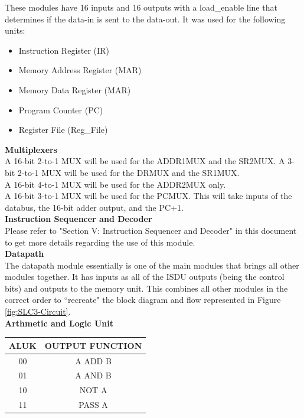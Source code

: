 \documentclass[journal, twocolumn, final,11pt,letterpaper]{IEEEtran}
\begin{document}
These modules have 16 inputs and 16 outputs with a load\_enable line that determines if the data-in is sent to the data-out. It was used for the following units: 
\begin{itemize}
	\item Instruction Register (IR)
	\item Memory Address Register (MAR)
	\item Memory Data Register (MAR)
	\item Program Counter (PC)
	\item Register File (Reg\_File)
\end{itemize} 

\normalsize\textbf{Multiplexers} \\

A 16-bit 2-to-1 MUX will be used for the ADDR1MUX and the SR2MUX. A 3-bit 2-to-1 MUX will be used for the DRMUX and the SR1MUX. \\

A 16-bit 4-to-1 MUX will be used for the ADDR2MUX only. \\

A 16-bit 3-to-1 MUX will be used for the PCMUX. This will take inputs of the databus, the 16-bit adder output, and the PC+1. \\

\normalsize\textbf{Instruction Sequencer and Decoder } \\

Please refer to "Section V: Instruction Sequencer and Decoder" in this document to get more details regarding the use of this module. \\

\normalsize\textbf{Datapath} \\

The datapath module essentially is one of the main modules that brings all other modules together. It has inputs as all of the ISDU outputs (being the control bits) and outputs to the memory unit. This combines all other modules in the correct order to ``recreate" the block diagram and flow represented in Figure \ref{fig:SLC3-Circuit}.\\


\normalsize\textbf{Arthmetic and Logic Unit} \\
\begin{table}[htbp]
	\centering
	\begin{tabular}{cc}	%
		\toprule	%
		ALUK & OUTPUT FUNCTION \\
		\midrule
		00 & A ADD B \\
		01 & A AND B \\
		10 & NOT A \\
		11 & PASS A \\
		\bottomrule	%
	\end{tabular}%
	\label{tab:ALU-table}
\end{table}
\end{document}
